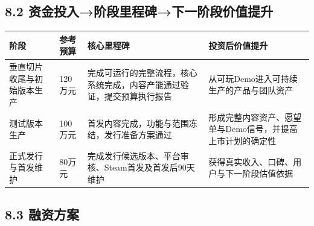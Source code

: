 \documentclass[UTF8,fontset=none,zihao=5,twoside]{ctexart}
\newcounter{none}
\newenvironment{BusinessTable}{%
  \begingroup
  \small
  \setlength{\parindent}{0pt}%
  \setlength{\parskip}{0pt}%
  \rowcolors{2}{TableAlt}{white}%
}{%
  \endgroup
}
\begin{document}
\subsection{8.2 资金投入→阶段里程碑→下一阶段价值提升}\label{82-ux8d44ux91d1ux6295ux5165ux9636ux6bb5ux91ccux7a0bux7891ux4e0bux4e00ux9636ux6bb5ux4ef7ux503cux63d0ux5347}

\begin{BusinessTable}

{\def\LTcaptype{none} %
\begin{longtable}[]{@{}
  >{\raggedright\arraybackslash}p{}
  >{\raggedright\arraybackslash}p{}
  >{\raggedright\arraybackslash}p{}
  >{\raggedright\arraybackslash}p{}@{}}
\toprule\noalign{}
\begin{minipage}[b]{\linewidth}\raggedright
\cellcolor{TableHeader}\color{BrandBlue}\bfseries 阶段
\end{minipage} & \begin{minipage}[b]{\linewidth}\raggedright
\cellcolor{TableHeader}\color{BrandBlue}\bfseries 参考预算
\end{minipage} & \begin{minipage}[b]{\linewidth}\raggedright
\cellcolor{TableHeader}\color{BrandBlue}\bfseries 核心里程碑
\end{minipage} & \begin{minipage}[b]{\linewidth}\raggedright
\cellcolor{TableHeader}\color{BrandBlue}\bfseries 投资后价值提升
\end{minipage} \\
\midrule\noalign{}
\endhead
\bottomrule\noalign{}
\endlastfoot
垂直切片收尾与初始版本生产 & 120万元 & 完成可运行的完整流程，核心系统完成，内容产能通过验证，提交预算执行报告 & 从可玩Demo进入可持续生产的产品与团队资产 \\
测试版本生产 & 100万元 & 首发内容完成，功能与范围冻结，发行准备方案通过 & 形成完整内容资产、愿望单与Demo信号，并提高上市计划的确定性 \\
正式发行与首发维护 & 80万元 & 完成发行候选版本、平台审核、Steam首发及首发后90天维护 & 获得真实收入、口碑、用户与下一阶段估值依据 \\
\end{longtable}
}

\end{BusinessTable}

\subsection{8.3 融资方案}\label{83-ux878dux8d44ux65b9ux6848}
\end{document}

